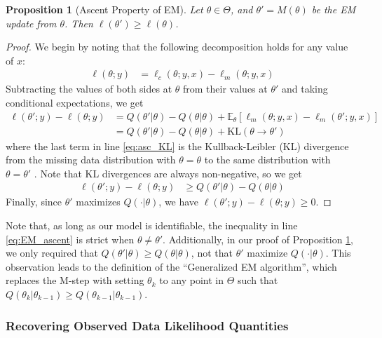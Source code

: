 \documentclass[11pt, oneside]{article}   	%
\newcommand{\bE}{\mathbb{E}}
\newtheorem{proposition}{Proposition}[section]
\begin{document}
\begin{proposition}[Ascent Property of EM]
    \label{thm2:EM_ascent}
    Let $\theta \in \Theta$, and $\theta' = M(\theta)$ be the EM update from $\theta$. Then $\ell(\theta') \geq \ell(\theta)$.
\end{proposition}

\begin{proof}
    We begin by noting that the following decomposition holds for any value of $x$:
    \begin{align}
        \ell(\theta; y) &= \ell_c(\theta; y, x) - \ell_m(\theta; y, x)
    \end{align}
    Subtracting the values of both sides at $\theta$ from their values at $\theta'$ and taking conditional expectations, we get
    \begin{align}
        \ell(\theta'; y) - \ell(\theta; y) &= Q(\theta'|\theta) - Q(\theta|\theta) + \bE_{\theta}[\ell_m(\theta; y, x) - \ell_m(\theta'; y, x)]\\
        &= Q(\theta'|\theta) - Q(\theta|\theta) + \mathrm{KL}(\theta \rightarrow \theta') \label{eq:asc_KL}
    \end{align}
    where the last term in line \ref{eq:asc_KL} is the Kullback-Leibler (KL) divergence from the missing data distribution with $\theta = \theta$ to the same distribution with $\theta = \theta'$ \citep{van98}. Note that KL divergences are always non-negative, so we get
    \begin{align}
    \ell(\theta'; y) - \ell(\theta; y) &\geq Q(\theta'|\theta) - Q(\theta|\theta)  \label{eq:EM_ascent}  
    \end{align}
    Finally, since $\theta'$ maximizes $Q(\cdot|\theta)$, we have $\ell(\theta'; y) - \ell(\theta; y) \geq 0$.
\end{proof}

Note that, as long as our model is identifiable, the inequality in line \ref{eq:EM_ascent} is strict when $\theta \neq \theta'$. Additionally, in our proof of Proposition \ref{thm2:EM_ascent}, we only required that $Q(\theta'|\theta) \geq Q(\theta|\theta)$, not that $\theta'$ maximize $Q(\cdot|\theta)$. This observation leads to the definition of the ``Generalized EM algorithm'', which replaces the M-step with setting $\theta_k$ to any point in $\Theta$ such that $Q(\theta_k|\theta_{k-1}) \geq Q(\theta_{k-1}|\theta_{k-1})$.



\subsubsection{Recovering Observed Data Likelihood Quantities}
\end{document}
